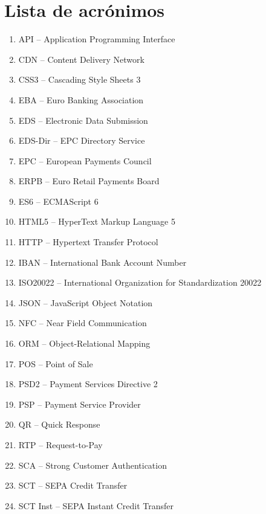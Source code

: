 \documentclass{book}
\begin{document}
\newpage


\newpage
\tableofcontents

\newpage
{} %
\chapter*{Lista de acrónimos}
\label{sec:Lista de acrónimos}
\begin{acronym}[SRTP]
\begin{enumerate}
  \item API – Application Programming Interface
  \item CDN – Content Delivery Network
  \item CSS3 – Cascading Style Sheets 3
  \item EBA – Euro Banking Association
  \item EDS – Electronic Data Submission
  \item EDS-Dir – EPC Directory Service
  \item EPC – European Payments Council
  \item ERPB – Euro Retail Payments Board
  \item ES6 – ECMAScript 6
  \item HTML5 – HyperText Markup Language 5
  \item HTTP – Hypertext Transfer Protocol
  \item IBAN – International Bank Account Number
  \item ISO20022 – International Organization for Standardization 20022
  \item JSON – JavaScript Object Notation
  \item NFC – Near Field Communication
  \item ORM – Object-Relational Mapping
  \item POS – Point of Sale
  \item PSD2 – Payment Services Directive 2
  \item PSP – Payment Service Provider
  \item QR – Quick Response
  \item RTP – Request-to-Pay
  \item SCA – Strong Customer Authentication
  \item SCT – SEPA Credit Transfer
  \item SCT Inst – SEPA Instant Credit Transfer

\end{enumerate}
\end{acronym}
\end{document}

